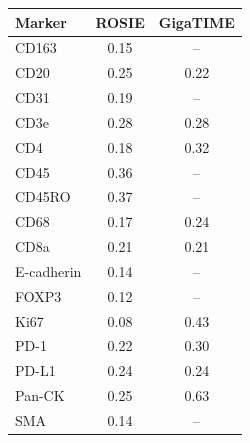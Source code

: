\begin{tabular}{@{}lcc@{}}
\toprule
Marker & ROSIE & GigaTIME \\
\midrule
CD163 & 0.15 & -- \\
CD20 & 0.25 & 0.22 \\
CD31 & 0.19 & -- \\
CD3e & 0.28 & 0.28 \\
CD4 & 0.18 & 0.32 \\
CD45 & 0.36 & -- \\
CD45RO & 0.37 & -- \\
CD68 & 0.17 & 0.24 \\
CD8a & 0.21 & 0.21 \\
E-cadherin & 0.14 & -- \\
FOXP3 & 0.12 & -- \\
Ki67 & 0.08 & 0.43 \\
PD-1 & 0.22 & 0.30 \\
PD-L1 & 0.24 & 0.24 \\
Pan-CK & 0.25 & 0.63 \\
SMA & 0.14 & -- \\
\bottomrule
\end{tabular}

